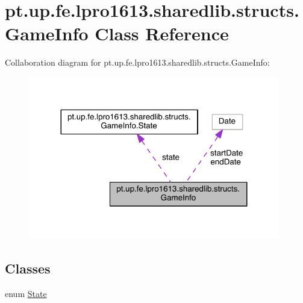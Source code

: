 \hypertarget{classpt_1_1up_1_1fe_1_1lpro1613_1_1sharedlib_1_1structs_1_1_game_info}{}\section{pt.\+up.\+fe.\+lpro1613.\+sharedlib.\+structs.\+Game\+Info Class Reference}
\label{classpt_1_1up_1_1fe_1_1lpro1613_1_1sharedlib_1_1structs_1_1_game_info}


Collaboration diagram for pt.\+up.\+fe.\+lpro1613.\+sharedlib.\+structs.\+Game\+Info\+:
\nopagebreak
\begin{figure}[H]
\begin{center}
\leavevmode
\includegraphics[width=311pt]{classpt_1_1up_1_1fe_1_1lpro1613_1_1sharedlib_1_1structs_1_1_game_info__coll__graph}
\end{center}
\end{figure}
\subsection*{Classes}
\begin{DoxyCompactItemize}
\item 
enum \hyperlink{enumpt_1_1up_1_1fe_1_1lpro1613_1_1sharedlib_1_1structs_1_1_game_info_1_1_state}{State}
\end{DoxyCompactItemize}

